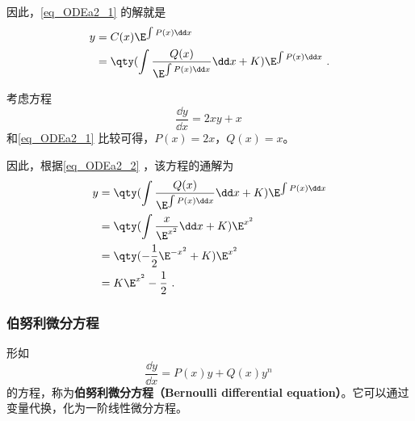 因此，\autoref{eq_ODEa2_1} 的解就是
\begin{equation}\label{eq_ODEa2_2}
\begin{aligned}
y&=C(x)\E^{\int P(x)\dd x}\\
&=\qty(\int\frac{Q(x)}{\E^{\int P(x)\dd x}}\dd x+K)\E^{\int P(x)\dd x}~.
\end{aligned}
\end{equation}

\begin{example}{}
考虑方程
\begin{equation}
\frac{\dd y}{\dd x}=2xy+x~
\end{equation}
和\autoref{eq_ODEa2_1} 比较可得，$P(x)=2x$，$Q(x)=x$。

因此，根据\autoref{eq_ODEa2_2} ，该方程的通解为
\begin{equation}
\begin{aligned}
y&=\qty(\int\frac{Q(x)}{\E^{\int P(x)\dd x}}\dd x+K)\E^{\int P(x)\dd x}\\
&=\qty(\int\frac{x}{\E^{x^2}}\dd x+K)\E^{x^2}\\
&=\qty(-\frac{1}{2}\E^{-x^2}+K)\E^{x^2}\\
&=K\E^{x^2}-\frac{1}{2}~.
\end{aligned}
\end{equation}
\end{example}

\subsubsection{伯努利微分方程}
形如
\begin{equation}
\frac{\dd y}{\dd x}=P(x)y+Q(x)y^n~
\end{equation}
的方程，称为\textbf{伯努利微分方程（Bernoulli differential equation）}。它可以通过变量代换，化为一阶线性微分方程。




















